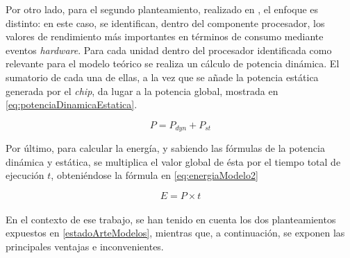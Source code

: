 {Por otro lado, para el segundo planteamiento, realizado en \cite{soton393728} \cite{soton418538}, el enfoque es distinto: en este caso, se identifican, dentro del componente procesador, los valores de rendimiento más importantes en términos de consumo mediante eventos \textit{hardware}. Para cada unidad dentro del procesador identificada como relevante para el modelo teórico se realiza un cálculo de potencia dinámica. El sumatorio de cada una de ellas, a la vez que se añade la potencia estática generada por el \textit{chip}, da lugar a la potencia global, mostrada en \ref{eq:potenciaDinamicaEstatica}.

\begin{equation}P = P_{dyn} + P_{st}\label{eq:potenciaDinamicaEstatica}\end{equation}

Por último, para calcular la energía, y sabiendo las fórmulas de la potencia dinámica y estática, se multiplica el valor global de ésta por el tiempo total de ejecución $t$, obteniéndose la fórmula en \ref{eq:energiaModelo2}

\begin{equation}E = P \times t\label{eq:energiaModelo2}\end{equation}
}

\paragraph{}{
\label{subs:comparativaModelos}
En el contexto de ese trabajo, se han tenido en cuenta los dos planteamientos expuestos en \ref{estadoArteModelos}, mientras que, a continuación, se exponen las principales ventajas e inconvenientes. }

